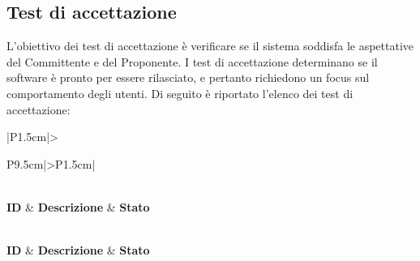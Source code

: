 \subsection{Test di accettazione}

\par L'obiettivo dei test di accettazione è verificare se il sistema soddisfa le aspettative del Committente e del Proponente. I test di accettazione determinano se il software è pronto per essere rilasciato, e pertanto richiedono un focus sul comportamento degli utenti. Di seguito è riportato l'elenco dei test di accettazione:

\bgroup
\begin{adjustwidth}{-0.5cm}{-0.5cm}
 	\begin{longtable}{|P{1.5cm}|>{\raggedright}P{9.5cm}|>{\arraybackslash}P{1.5cm}|}
    \caption{Test di accettazione}
  	\label{tab:test-accettazione} \\
	  \hline
		\textbf{ID} & \textbf{Descrizione} & \textbf{Stato} \\ 
		\hline
		\endfirsthead

    \caption[]{Test di accettazione (continua)} \\
		\hline
		\textbf{ID} & \textbf{Descrizione} & \textbf{Stato} \\ 
		\hline
		\endhead

		\hline
		 \\ 
		\hline
		\endfoot

		\hline
		\endlastfoot


\end{longtable}
\end{adjustwidth}
